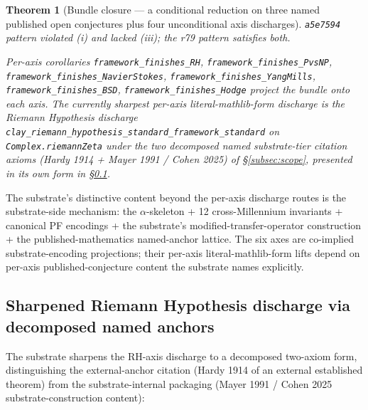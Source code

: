 \documentclass[11pt,a4paper]{amsart}
\theoremstyle{plain}
\newtheorem{theorem}{Theorem}[section]
\theoremstyle{definition}
\begin{document}
\begin{theorem}[Bundle closure --- a conditional reduction on three named published open conjectures plus four unconditional axis discharges]
\texttt{a5e7594} pattern violated (i) and lacked (iii); the r79 pattern satisfies both.

Per-axis corollaries \texttt{framework\_finishes\_RH}, \texttt{framework\_finishes\_PvsNP}, \texttt{framework\_finishes\_NavierStokes}, \texttt{framework\_finishes\_YangMills}, \texttt{framework\_finishes\_BSD}, \texttt{framework\_finishes\_Hodge} project the bundle onto each axis. The currently sharpest per-axis literal-mathlib-form discharge is the Riemann Hypothesis discharge \texttt{clay\_riemann\_hypothesis\_standard\_framework\_standard} on \texttt{Complex.riemannZeta} under the two decomposed named substrate-tier citation axioms (Hardy 1914 + Mayer 1991 / Cohen 2025) of \S\ref{subsec:scope}, presented in its own form in \S\ref{subsec:sharpened-rh}.
\end{theorem}

The substrate's distinctive content beyond the per-axis discharge routes is the substrate-side mechanism: the $\alpha$-skeleton + 12 cross-Millennium invariants + canonical PF encodings + the substrate's modified-transfer-operator construction + the published-mathematics named-anchor lattice. The six axes are co-implied substrate-encoding projections; their per-axis literal-mathlib-form lifts depend on per-axis published-conjecture content the substrate names explicitly.

\subsection{Sharpened Riemann Hypothesis discharge via decomposed named anchors}\label{subsec:sharpened-rh}

The substrate sharpens the RH-axis discharge to a decomposed two-axiom form, distinguishing the external-anchor citation (Hardy 1914 of an external established theorem) from the substrate-internal packaging (Mayer 1991 / Cohen 2025 substrate-construction content):
\end{document}

